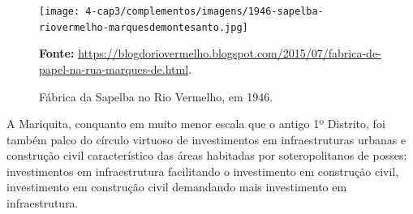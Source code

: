 \begin{figure}[!htp]
\centering
\caption{Fábrica da Sapelba no Rio Vermelho, em 1946.}
\texttt{[image: 4-cap3/complementos/imagens/1946-sapelba-riovermelho-marquesdemontesanto.jpg]}{\par \footnotesize \textbf{Fonte:} \url{https://blogdoriovermelho.blogspot.com/2015/07/fabrica-de-papel-na-rua-marques-de.html}.}
\label{fig:sapelba}
\end{figure}


A Mariquita, conquanto em muito menor escala que o antigo 1º Distrito, foi também palco do círculo virtuoso de investimentos em infraestruturas urbanas e construção civil característico das áreas habitadas por soteropolitanos de posses: investimentos em infraestrutura facilitando o investimento em construção civil, investimento em construção civil demandando mais investimento em infraestrutura.

